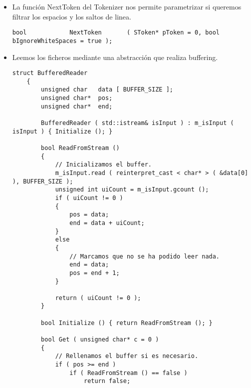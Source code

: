 \begin{itemize}
\begin{lstlisting}[caption={Trigger para contar lineas en un comentario multilinea}]
    switch ( c )
    {
        case '\r':
            bLastCharWasCR = true;
            ++m_uiLine;
            m_uiCol = 0;
            break;
        case '\n':
            m_uiCol = 0;
            if ( bLastCharWasCR == true )
            {
                bLastCharWasCR = false;
            }
            else
            {
                ++m_uiLine;
            }
            break;
    }
}
        \end{lstlisting}


    \item La función NextToken del Tokenizer nos permite parametrizar si queremos filtrar los espacios y los saltos de linea.
    
        \begin{lstlisting}[caption={Estructura usada para definir los errores}]
    bool            NextToken       ( SToken* pToken = 0, bool bIgnoreWhiteSpaces = true );
        \end{lstlisting}
    
    \item Leemos los ficheros mediante una abstracción que realiza buffering.
    
        \begin{lstlisting}[caption={BufferedReader}]
        struct BufferedReader
    {
        unsigned char   data [ BUFFER_SIZE ];
        unsigned char*  pos;
        unsigned char*  end;

        BufferedReader ( std::istream& isInput ) : m_isInput ( isInput ) { Initialize (); }

        bool ReadFromStream ()
        {
            // Inicializamos el buffer.
            m_isInput.read ( reinterpret_cast < char* > ( &data[0] ), BUFFER_SIZE );
            unsigned int uiCount = m_isInput.gcount ();
            if ( uiCount != 0 )
            {
                pos = data;
                end = data + uiCount;
            }
            else
            {
                // Marcamos que no se ha podido leer nada.
                end = data;
                pos = end + 1;
            }

            return ( uiCount != 0 );
        }

        bool Initialize () { return ReadFromStream (); }
        
        bool Get ( unsigned char* c = 0 )
        {
            // Rellenamos el buffer si es necesario.
            if ( pos >= end )
                if ( ReadFromStream () == false )
                    return false;


\end{lstlisting}
\end{itemize}
